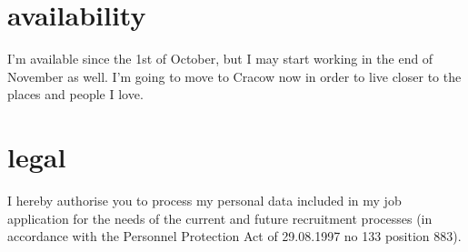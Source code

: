 \documentclass[]{friggeri-cv}
\begin{document}
\section{availability}
{I'm available since the 1st of October, but I may start working in the end of November as well. I'm going to move to Cracow now in order to live closer to the places and people I love.}

\section{legal}
{I hereby authorise you to process my personal data included in my job application for the needs of the current and future recruitment processes (in accordance with the Personnel Protection Act of 29.08.1997 no 133 position 883).}
\end{document}
